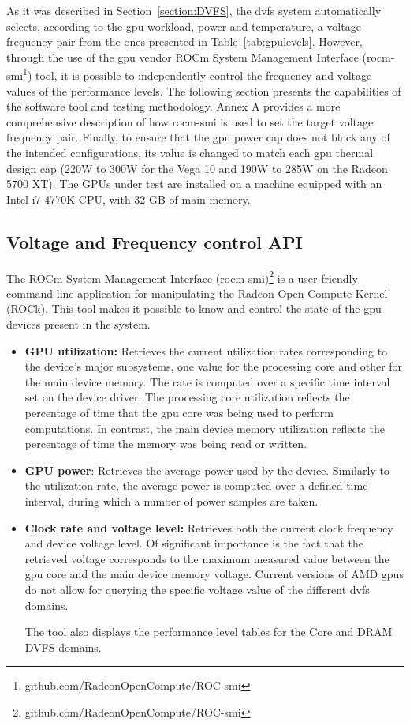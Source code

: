 As it was described in Section~\ref{section:DVFS}, the  \acrshort{dvfs} system automatically selects, according to the \acrshort{gpu} workload, power and temperature, a voltage-frequency pair from the ones presented in Table~\ref{tab:gpulevels}. However, through the use of the \acrshort{gpu} vendor ROCm System Management Interface (rocm-smi\footnote{github.com/RadeonOpenCompute/ROC-smi}) tool, it is possible to independently control the frequency and voltage values of the performance levels. The following section presents the capabilities of the software tool and testing methodology. Annex A provides a more comprehensive description of how rocm-smi is used to set the target voltage frequency pair. Finally, to ensure that the  \acrshort{gpu} power cap does not block any of the intended configurations, its value is changed to match each \acrshort{gpu} thermal design cap (220W to 300W for the Vega 10 and 190W to 285W on the Radeon 5700 XT). The GPUs under test are installed on a machine equipped with an Intel i7 4770K CPU, with 32 GB of main memory. 




\subsection{Voltage and Frequency control API}
The ROCm System Management Interface (rocm-smi)\footnote{github.com/RadeonOpenCompute/ROC-smi} is a user-friendly command-line application for manipulating the Radeon Open Compute Kernel (ROCk). This tool makes it possible to know and control the state of the \acrshort{gpu} devices present in the system. 

\begin{itemize}
\item \textbf{GPU utilization:} Retrieves the current utilization rates corresponding to the device's major subsystems, one value for the processing core and other for the main device memory. The rate is computed over a specific time interval set on the device driver. The processing core utilization reflects the percentage of time that the \acrshort{gpu} core was being used to perform computations. In contrast, the main device memory utilization reflects the percentage of time the memory was being read or written.

\item \textbf{GPU power}: Retrieves the average power used by the device. Similarly to the utilization rate, the average power is computed over a defined time interval, during which a number of power samples are taken.

\item \textbf{Clock rate and voltage level:} Retrieves both the current clock frequency and device voltage level. Of significant importance is the fact that the retrieved voltage  corresponds to the maximum measured value between the \acrshort{gpu} core and the main device memory voltage. Current versions of AMD \acrshort{gpu}s do not allow for querying the specific voltage value of the different \acrshort{dvfs} domains.

The tool also displays the performance level tables for the Core and DRAM DVFS domains.
\end{itemize}

